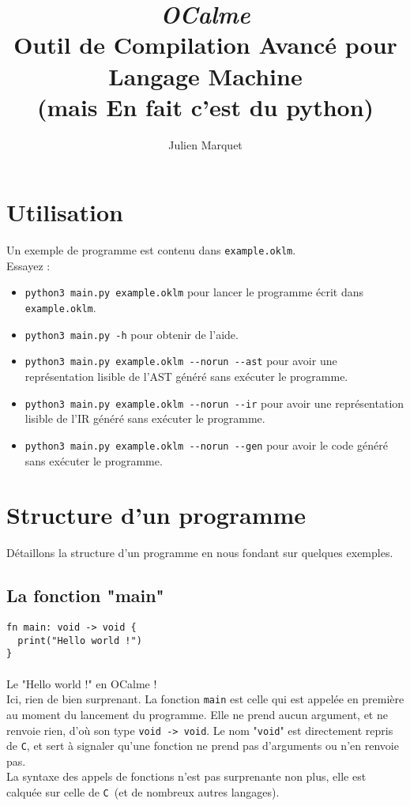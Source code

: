 \documentclass[french]{article}
\title{\emph{OCalme}\\Outil de Compilation Avancé pour Langage Machine\\(mais En fait c'est du python)}
\author{Julien Marquet}
\begin{document}
\newcommand\setccl{\mathcal{C}}
\newcommand\setrul{\mathcal{R}}
\newcommand\setder{\mathcal{D}}

\newcommand\opnextder{\mathit{Cons}}

\maketitle
\tableofcontents{}

\section{Utilisation}

Un exemple de programme est contenu dans \verb|example.oklm|. \\
Essayez :
\begin{itemize}
  \item \verb|python3 main.py example.oklm|
    pour lancer le programme écrit dans \verb|example.oklm|.
  \item \verb|python3 main.py -h| pour obtenir de l'aide.
  \item \verb|python3 main.py example.oklm --norun --ast|
    pour avoir une représentation lisible de l'AST généré
    sans exécuter le programme.
    \item \verb|python3 main.py example.oklm --norun --ir|
      pour avoir une représentation lisible de l'IR généré
      sans exécuter le programme.
  \item \verb|python3 main.py example.oklm --norun --gen|
    pour avoir le code généré sans exécuter le programme.
\end{itemize}

\section{Structure d'un programme}

Détaillons la structure d'un programme en nous fondant sur quelques exemples.

\subsection{La fonction "main"}

\begin{lstlisting}
fn main: void -> void {
  print("Hello world !")
}
\end{lstlisting}

\paragraph{} Le "Hello world !" en OCalme ! \\
Ici, rien de bien surprenant. La fonction \verb|main| est celle qui
est appelée en première au moment du lancement du programme.
Elle ne prend aucun argument, et ne renvoie rien, d'où son type
\verb|void -> void|. Le nom "\verb|void|" est directement repris de
\verb|C|, et sert à signaler qu'une fonction ne prend pas d'arguments
ou n'en renvoie pas. \\
La syntaxe des appels de fonctions n'est pas surprenante non plus, elle
est calquée sur celle de \verb|C| (et de nombreux autres langages).
\end{document}
